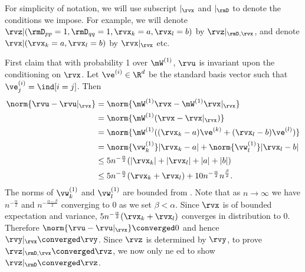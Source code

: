\begin{proofof}{} For simplicity of notation, we will use subscript $|_\rvx$ and $|_\rmD$ to denote the conditions we impose. For example, we will denote $\rvz\vert(\rmD_{pp}=1, \rmD_{qq}=1, \rvx_k=a, \rvx_l=b)$ by $\rvz|_{\rmD,\rvx}$, and denote $\rvx|(\rvx_k=a, \rvx_l=b)$ by $\rvx|_\rvx$ etc.

First claim that with probability 1 over $\mW^{(1)}$, $\rvu$ is invariant upon the conditioning on $\rvx$. Let $\ve^{(i)}\in\R^d$ be the standard basis vector such that $\ve^{(i)}_j=\ind[i=j]$. Then \begin{equation}
\begin{split}
    \norm{\rvu-\rvu|_\rvx} &= \norm{\mW^{(1)}\rvx - \mW^{(1)}\rvx|_\rvx}\\
    &= \norm{\mW^{(1)}(\rvx -\rvx|_\rvx)}\\
    &= \norm{\mW^{(1)}((\rvx_k-a)\ve^{(k)} + (\rvx_l-b)\ve^{(l)})}\\
    &= \norm{\vw^{(1)}_k}|\rvx_k-a| + \norm{\vw^{(1)}_l}|\rvx_l-b|\\
    &\leq 5n^{-\frac\alpha2}(|\rvx_k|+|\rvx_l|+|a|+|b|)\\
    &\leq 5n^{-\frac\alpha2}(\rvx_k+\rvx_l) + 10n^{-\frac\alpha2}n^{\frac\beta2}.
\end{split}
\end{equation}
The norms of $\vw_k^{(1)}$ and $\vw_l^{(1)}$ are bounded from .
Note that as $n\to\infty$ we have $n^{-\frac\alpha2}$ and $n^{-\frac{\alpha-\beta}{2}}$ converging to 0 as we set $\beta < \alpha$.
Since $\rvx$ is of bounded expectation and variance, $5n^{-\frac\alpha2}(\rvx_k+\rvx_l)$ converges in distribution to $0$. Therefore $\norm{\rvu-\rvu|_\rvx}\converged 0$ and hence $\rvy|_\rvx\converged\rvy$. Since $\rvz$ is determined by $\rvy$, to prove $\rvz|_{\rmD,\rvx}\converged \rvz$, we now only ne
ed to show $\rvz|_{\rmD}\converged \rvz$.


\end{proofof}
